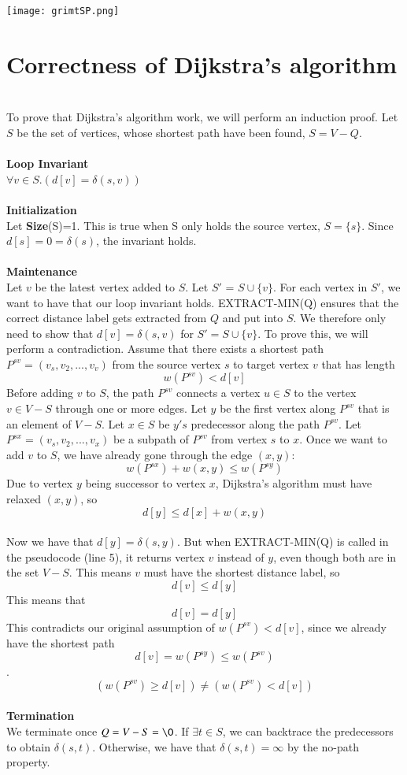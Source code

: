 \documentclass[11pt]{article}
\begin{document}
\texttt{[image: grimtSP.png]}


\newpage
\section{Correctness of Dijkstra's algorithm}\\
To prove that Dijkstra's algorithm work, we will perform an induction proof. Let $S$ be the set of vertices, whose shortest path have been found, $S=V-Q$.\\\\
\textbf{Loop Invariant}\\
$\forall v\in S.(d[v] = \delta(s,v))$\\\\
\textbf{Initialization}\\
Let \textbf{Size}(S)=1. This is true when S only holds the source vertex, $S = \{s\}$. Since $d[s]=0=\delta(s)$, the invariant holds.\\\\
\textbf{Maintenance}\\
Let $v$ be the latest vertex added to $S$. Let $S'$ = $S \cup \{v\}$. For each vertex in $S'$, we want to have that our loop invariant holds. EXTRACT-MIN(Q) ensures that the correct distance label gets extracted from $Q$ and put into $S$. We therefore only need to show that $d[v]=\delta(s,v)$ for $S'=S \cup \{v\}$. To prove this, we will perform a contradiction. Assume that there exists a shortest path $P^{sv}=(v_s, v_2, ..., v_v)$ from the source vertex $s$ to target vertex $v$ that has length $$w(P^{sv}) < d[v]$$
Before adding $v$ to $S$, the path $P^{sv}$ connects a vertex $u\in S$ to the vertex $v\in V-S$ through one or more edges. Let $y$ be the first vertex along $P^{sv}$ that is an element of $V-S$. Let $x\in S$ be $y's$ predecessor along the path $P^{sv}$. Let $P^{sx}=(v_s, v_2, ..., v_x)$ be a subpath of $P^{sv}$ from vertex $s$ to $x$. Once we want to add $v$ to $S$, we have already gone through the edge $(x,y)$: $$w(P^{sx}) + w(x,y) \leq w(P^{sy})$$
Due to vertex $y$ being successor to vertex $x$, Dijkstra's algorithm must have relaxed $(x,y)$, so $$d[y]\leq d[x]+w(x,y)$$\\
Now we have that $d[y] = \delta(s,y)$. But when EXTRACT-MIN(Q) is called in the pseudocode (line 5), it returns vertex $v$ instead of $y$, even though both are in the set $V-S$. This means $v$ must have the shortest distance label, so $$d[v] \leq d[y]$$
This means that $$d[v] = d[y]$$ This contradicts our original assumption of $w(P^{sv}) < d[v]$, since we already have the shortest path $$d[v] = w(P^{sy}) \leq w(P^{sv})$$.
$$(w(P^{sv}) \geq d[v]) \neq (w(P^{sv}) < d[v])$$\\
\textbf{Termination}\\
We terminate once $Q = V-S =\O$. If $\exists t \in S$, we can backtrace the predecessors to obtain $\delta(s,t)$. Otherwise, we have that $\delta(s,t) = \infty$ by the no-path property.\\
\end{document}
